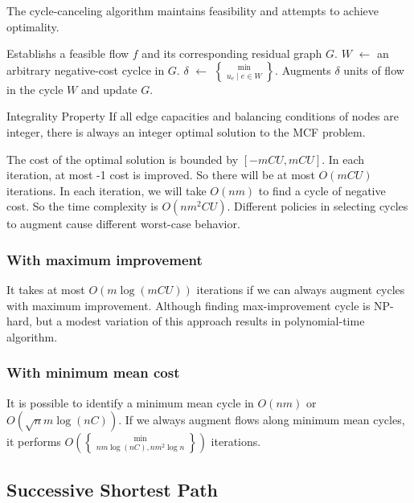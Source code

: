 \documentclass[UTF8,a4paper]{ctexart}
\begin{document}
The cycle-canceling algorithm maintains feasibility and attempts to achieve optimality.

\begin{algorithmic}
        \State Establishs a feasible flow $f$ and its corresponding residual graph $G$.
            \State $W$ $\gets$ an arbitrary negative-cost cyclce in $G$.
            \State $\delta$ $\gets$ $\min \brace{u_e \mid e \in W}$.
            \State Augments $\delta$ units of flow in the cycle $W$ and update $G$.
        \EndWhile
    \EndProcedure
\end{algorithmic}

\begin{theorem}{Integrality Property}
    If all edge capacities and balancing conditions of nodes are integer,
    there is always an integer optimal solution to the MCF problem.
\end{theorem}

The cost of the optimal solution is bounded by $[-mCU, mCU]$.
In each iteration, at most -1 cost is improved.
So there will be at most $O(mCU)$ iterations.
In each iteration, we will take $O(nm)$ to find a cycle of negative cost.
So the time complexity is $O(nm^2CU)$.
Different policies in selecting cycles to augment cause different worst-case behavior.

\subsubsection{With maximum improvement}

It takes at most $O(m\log (mCU))$ iterations if we can always augment cycles with maximum improvement.
Although finding max-improvement cycle is NP-hard,
but a modest variation of this approach results in polynomial-time algorithm.

\subsubsection{With minimum mean cost}

It is possible to identify a minimum mean cycle in $O(nm)$ or $O(\sqrt{n} m \log (nC))$.
If we always augment flows along minimum mean cycles,
it performs $O(\min\brace{nm \log (nC), nm^2 \log n})$ iterations.

\subsection{Successive Shortest Path}
\end{document}
